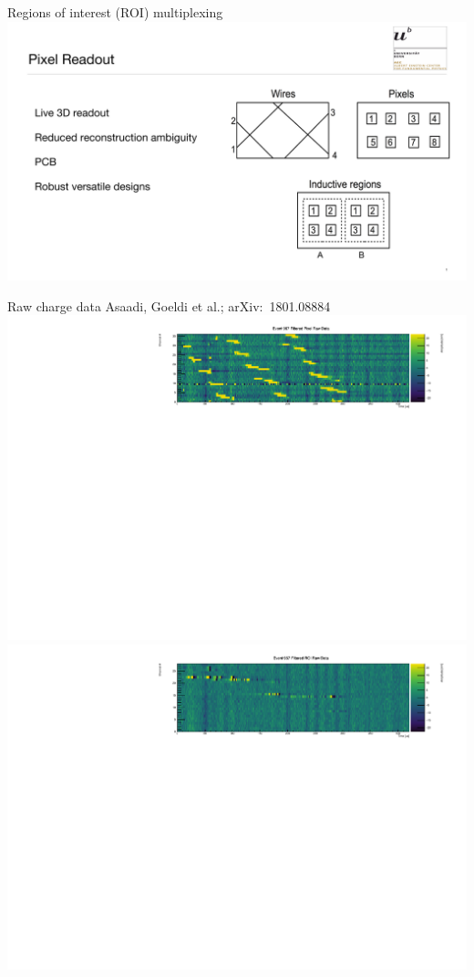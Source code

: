 \documentclass[]{beamer}
\begin{document}
\begin{frame}{Regions of interest (ROI) multiplexing}
	\centering
	\includegraphics[page=2, viewport=20 0 1770 845, clip, width=\textwidth]{defence/Pixels}
\end{frame}

\begin{frame}{Raw charge data}{}
	{\tiny Asaadi, Goeldi et al.; arXiv:~1801.08884~\cite{pixel_paper}}\\
	\centering
	\includegraphics[viewport=40 0 520 100, clip, width=\textwidth]{defence/event967_rawFilteredPixel}\\
	\includegraphics[viewport=276 424 800 573, clip, width=\textwidth]{defence/event967_rawFilteredROI}
\end{frame}
\end{document}
